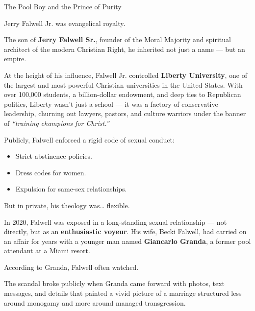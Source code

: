 \begin{HistoricalSidebar}{The Pool Boy and the Prince of Purity}

    Jerry Falwell Jr. was evangelical royalty.

    \medskip
    
    The son of \textbf{Jerry Falwell Sr.}, founder of the Moral Majority and spiritual architect of the modern Christian Right, he inherited not just a name — but an empire.

    \medskip
    
    At the height of his influence, Falwell Jr. controlled \textbf{Liberty University}, one of the largest and most powerful Christian universities in the United States.  
    With over 100,000 students, a billion-dollar endowment, and deep ties to Republican politics, Liberty wasn’t just a school — it was a factory of conservative leadership, churning out lawyers, pastors, and culture warriors under the banner of \textit{“training champions for Christ.”}

    \medskip
    
    Publicly, Falwell enforced a rigid code of sexual conduct:

    \medskip
    
    \begin{itemize}
      \item Strict abstinence policies.  
      \item Dress codes for women.  
      \item Expulsion for same-sex relationships.  
    \end{itemize}

    \medskip
    
    But in private, his theology was… flexible.
    
    \medskip
    
    In 2020, Falwell was exposed in a long-standing sexual relationship — not directly, but as an \textbf{enthusiastic voyeur}.  
    His wife, Becki Falwell, had carried on an affair for years with a younger man named \textbf{Giancarlo Granda}, a former pool attendant at a Miami resort.

    \medskip
    
    According to Granda, Falwell often watched.

    \medskip
    
    The scandal broke publicly when Granda came forward with photos, text messages, and details that painted a vivid picture of a marriage structured less around monogamy and more around managed transgression.
    

\end{HistoricalSidebar}

